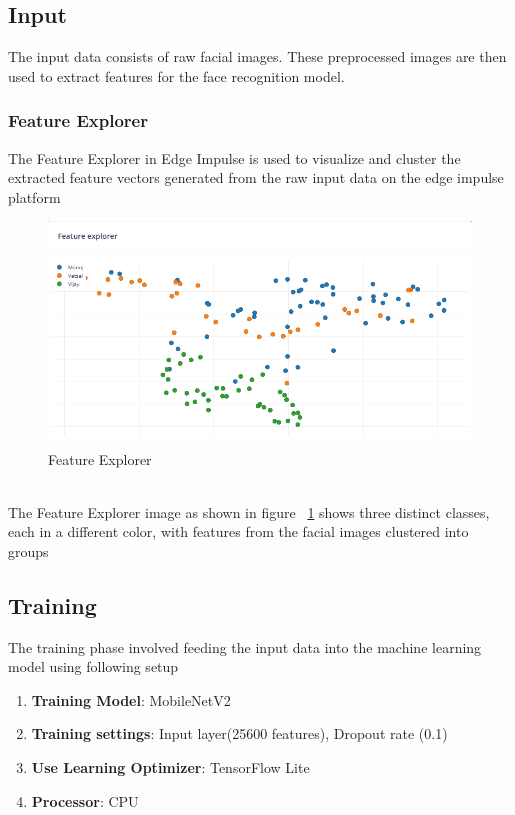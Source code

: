 \subsection{Input}
The input data consists of raw facial images. These preprocessed images are then used to extract features for the face recognition model.
\subsubsection{Feature Explorer}
The Feature Explorer in Edge Impulse is used to visualize and cluster the extracted feature vectors generated from the raw input data on the edge impulse platform 
\begin{figure}
	\begin{center}
		\includegraphics[width=0.7\linewidth]{Images/EdgeImpulse/FeatureExplorer.png}
		\caption{Feature Explorer}
		\label{FeatureExplorer}
	\end{center}
\end{figure}
\\
The Feature Explorer image as shown in figure ~\ref{FeatureExplorer} shows three distinct classes, each in a different color, with features from the facial images clustered into groups


\subsection{Training}
The training phase involved feeding the input data into the machine learning model using following setup
\begin{enumerate}
	\item \textbf{Training Model}: MobileNetV2 
	\item \textbf{Training settings}: Input layer(25600 features), Dropout rate (0.1)
	\item \textbf{Use Learning Optimizer}: TensorFlow Lite
	\item \textbf{Processor}: CPU
\end{enumerate}

